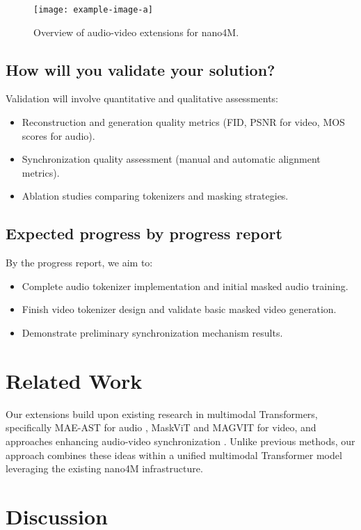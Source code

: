 \documentclass[10pt,conference,compsocconf]{IEEEtran}
\begin{document}
\begin{figure}[tbph]
  \centering
  \texttt{[image: example-image-a]}
  \caption{Overview of audio-video extensions for nano4M.}
  \label{fig:av-extension}
\end{figure}

\subsection{How will you validate your solution?}
Validation will involve quantitative and qualitative assessments:
\begin{itemize}
    \item Reconstruction and generation quality metrics (FID, PSNR for video, MOS scores for audio).
    \item Synchronization quality assessment (manual and automatic alignment metrics).
    \item Ablation studies comparing tokenizers and masking strategies.
\end{itemize}

\subsection{Expected progress by progress report}
By the progress report, we aim to:
\begin{itemize}
    \item Complete audio tokenizer implementation and initial masked audio training.
    \item Finish video tokenizer design and validate basic masked video generation.
    \item Demonstrate preliminary synchronization mechanism results.
\end{itemize}

\section{Related Work}
Our extensions build upon existing research in multimodal Transformers, specifically MAE-AST for audio \cite{MAEAST}, MaskViT \cite{MaskViT} and MAGVIT \cite{MAGVIT} for video, and approaches enhancing audio-video synchronization \cite{videotoaudio}. Unlike previous methods, our approach combines these ideas within a unified multimodal Transformer model leveraging the existing nano4M infrastructure.

\section{Discussion}
\end{document}
